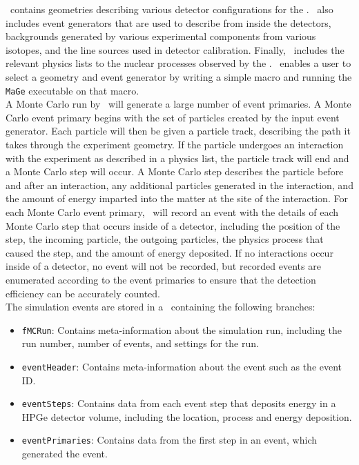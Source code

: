 \documentclass[/main.tex]{subfiles}
\begin{document}
\Mage\ contains geometries describing various detector configurations for the \MJD.
\Mage\ also includes event generators that are used to describe \bb from inside the detectors, backgrounds generated by various experimental components from various isotopes, and the line sources used in detector calibration.
Finally, \Mage\ includes the relevant physics lists to the nuclear processes observed by the \MJD.
\Mage\ enables a user to select a geometry and event generator by writing a simple macro and running the \texttt{MaGe} executable on that macro.
\\
A Monte Carlo run by \geant\ will generate a large number of event primaries.
A Monte Carlo event primary begins with the set of particles created by the input event generator.
Each particle will then be given a particle track, describing the path it takes through the experiment geometry.
If the particle undergoes an interaction with the experiment as described in a physics list, the particle track will end and a Monte Carlo step will occur.
A Monte Carlo step describes the particle before and after an interaction, any additional particles generated in the interaction, and the amount of energy imparted into the matter at the site of the interaction.
For each Monte Carlo event primary, \Mage\ will record an event with the details of each Monte Carlo step that occurs inside of a detector, including the position of the step, the incoming particle, the outgoing particles, the physics process that caused the step, and the amount of energy deposited.
If no interactions occur inside of a detector, no event will not be recorded, but recorded events are enumerated according to the event primaries to ensure that the detection efficiency can be accurately counted.
\\
The simulation events are stored in a \TTree\ containing the following branches:
\begin{itemize}
\item{\texttt{fMCRun}:}
  Contains meta-information about the simulation run, including the run number, number of events, and settings for the run.
\item{\texttt{eventHeader}:}
  Contains meta-information about the event such as the event ID.
\item{\texttt{eventSteps}:}
  Contains data from each event step that deposits energy in a HPGe detector volume, including the location, process and energy deposition.
\item{\texttt{eventPrimaries}:}
  Contains data from the first step in an event, which generated the event.
\end{itemize}
\end{document}

